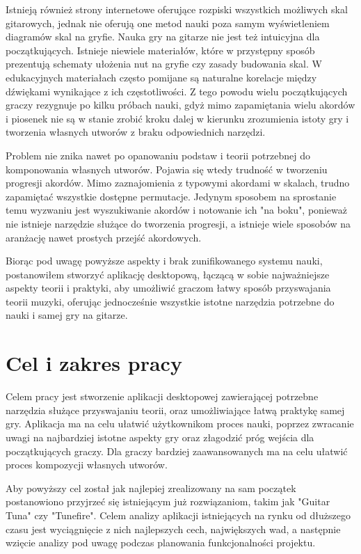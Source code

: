 Istnieją również strony internetowe oferujące rozpiski wszystkich możliwych skal gitarowych, jednak nie oferują one metod nauki poza samym wyświetleniem diagramów skal na gryfie. Nauka gry na gitarze nie jest też intuicyjna dla początkujących. Istnieje niewiele materiałów, które w przystępny sposób prezentują schematy ułożenia nut na gryfie czy zasady budowania skal. W edukacyjnych materiałach często pomijane są naturalne korelacje między dźwiękami wynikające z ich częstotliwości. Z tego powodu wielu początkujących graczy rezygnuje po kilku próbach nauki, gdyż mimo zapamiętania wielu akordów i piosenek nie są w stanie zrobić kroku dalej w kierunku zrozumienia istoty gry i tworzenia własnych utworów z braku odpowiednich narzędzi.

Problem nie znika nawet po opanowaniu podstaw i teorii potrzebnej do komponowania własnych utworów. Pojawia się wtedy trudność w tworzeniu progresji akordów. Mimo zaznajomienia z typowymi akordami w skalach, trudno zapamiętać wszystkie dostępne permutacje. Jedynym sposobem na sprostanie temu wyzwaniu jest wyszukiwanie akordów i notowanie ich "na boku", ponieważ nie istnieje narzędzie służące do tworzenia progresji, a istnieje wiele sposobów na aranżację nawet prostych przejść akordowych.

Biorąc pod uwagę powyższe aspekty i brak zunifikowanego systemu nauki, postanowiłem stworzyć aplikację desktopową, łączącą w sobie najważniejsze aspekty teorii i praktyki, aby umożliwić graczom łatwy sposób przyswajania teorii muzyki, oferując jednocześnie wszystkie istotne narzędzia potrzebne do nauki i samej gry na gitarze.

\section{Cel i zakres pracy}

Celem pracy jest stworzenie aplikacji desktopowej zawierającej potrzebne narzędzia służące przyswajaniu teorii, oraz umożliwiające łatwą praktykę samej gry. Aplikacja ma na celu ułatwić użytkownikom proces nauki, poprzez zwracanie uwagi na najbardziej istotne aspekty gry oraz złagodzić próg wejścia dla początkujących graczy. Dla graczy bardziej zaawansowanych ma na celu ułatwić proces kompozycji własnych utworów. 

Aby powyższy cel został jak najlepiej zrealizowany na sam początek postanowiono przyjrzeć się istniejącym już rozwiązaniom, takim jak "Guitar Tuna" czy "Tunefire". Celem analizy aplikacji istniejących na rynku od dłuższego czasu jest wyciągnięcie z nich najlepszych cech, największych wad, a następnie wzięcie analizy pod uwagę podczas planowania funkcjonalności projektu. 

